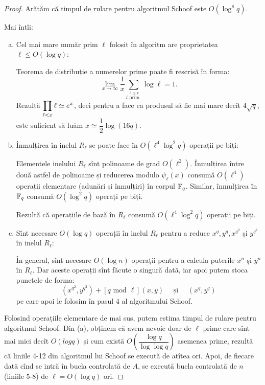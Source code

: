 \begin{proof}
    Arătăm că timpul de rulare pentru algoritmul Schoof este $ O(\log^8 q) $.

    Mai întîi:
    \begin{enumerate}[(a)]
        \item Cel mai mare număr prim $ \ell $ folosit în algoritm are
            proprietatea $ \ell \leq O(\log q) $:

            Teorema de distribuție a numerelor prime poate fi rescrisă în forma:
            \[
                \lim_{x \to \infty} \dfrac{1}{x} %
                \sum_{\stackrel{\ell \leq x}{l\text{ prim }}} \log \ell = 1.
            \]
            Rezultă $ \displaystyle\prod_{\ell < x} \ell \simeq e^x $, deci pentru a face
            ca produsul să fie mai mare decît $ 4 \sqrt{q} $, este suficient
            să luăm $ x \simeq \dfrac{1}{2} \log(16 q) $.
        \item Înmulțirea în inelul $ R_\ell $ se poate face în $ O(\ell^4 \log^2 q) $ operații
            pe biți:

            Elementele inelului $ R_\ell $ sînt polinoame de grad $ O(\ell^2) $.
            Înmulțirea între două astfel de polinoame și reducerea modulo
            $ \psi_\ell(x) $ consumă $ O(\ell^4) $ operații elementare
            (adunări și înmulțiri) în corpul $ \mathbb{F}_q $. Similar, înmulțirea
            în $ \mathbb{F}_q $ consumă $ O(\log^2 q) $ operați pe biți.

            Rezultă că operațiile de bază în $ R_\ell $ consumă $ O(\ell^4 \log^2 q) $
            operații pe biți.

        \item Sînt necesare $ O(\log q) $ operații în inelul $ R_\ell $ pentru
            a reduce $ x^q, y^q, x^{q^2} $ și $ y^{q^2} $ în inelul $ R_\ell $:


            În general, sînt necesare $ O(\log n) $ operații pentru a
            calcula puterile $ x^n $ și $ y^n $ în $ R_\ell $.
            Dar aceste operații sînt făcute o singură dată, iar apoi putem stoca
            punctele de forma:
            \[
                (x^{q^2}, y^{q^2}) + [q \text{ mod } \ell] (x, y) \quad \text{ și } \quad (x^q, y^q)
            \]
            pe care apoi le folosim în pasul 4 al algoritmului Schoof.
    \end{enumerate}

    Folosind operațiile elementare de mai sus, putem estima timpul de rulare pentru
    algoritmul Schoof. Din (a), obținem că avem nevoie doar de $ \ell $ prime care sînt
    mai mici decît $ O(log q) $ și cum există $ O\left( \dfrac{\log q}{\log \log q} \right) $
    asemenea prime, rezultă că liniile 4-12 din algoritmul lui Schoof
    se execută de atîtea ori. Apoi, de fiecare dată cînd se intră în bucla
    controlată de $ A $, se execută bucla controlată de $ n $ (liniile
    5-8) de $ \ell = O(\log q) $ ori.


\end{proof}
